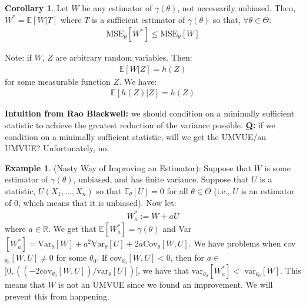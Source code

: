 \documentclass[11pt]{scrartcl}
\newcommand{\R}[0]{\mathbb{R}}
\theoremstyle{definition}
\newtheorem{corollary}{Corollary}
\newtheorem{ex}{Example}
\theoremstyle{remark}
\newcommand{\EX}[1]{\mathbb{E}\left[#1 \right]}
\newcommand{\EXth}[1]{\mathbb{E}_\theta \left[ #1 \right]}
\begin{document}
{\begin{corollary}
	Let $W$ be any estimator of $\gamma ( \theta)$, not necessarily unbiased. Then, $W^* = \EX{W|T}$ where $T$ is a sufficient estimator of $\gamma (\theta)$ so that, $\forall \theta \in \Theta$: 
	\begin{align*}
		\text{MSE}_\theta [W^*] \leq \text{MSE}_\theta [W]
	\end{align*}
\end{corollary}

Note: if $W$, $Z$ are arbitrary random variables. Then: 
\begin{align*}
	\EX{W|Z} = h(Z)
\end{align*}
for some measurable function $Z$. We have: 
\begin{align*}
	\EX{ h(Z) | Z} = h(Z) 
\end{align*}

\textbf{Intuition from Rao Blackwell:} we should condition on a minimally sufficient statistic to achieve the greatest reduction of the variance possible. \textbf{\underline{Q}:} if we condition on a minimally sufficient statistic, will we get the UMVUE/an UMVUE? Unfortunately, no. 

\begin{ex}(Nasty Way of Improving an Estimator): 
	Suppose that $W$ is some estimator of $\gamma (\theta)$, unbiased, and has finite variance. Suppose that $U$ is a statistic, $U(X_1, ..., X_n)$ so that $\EXth{U} = 0$ for all $\theta \in \Theta$ (i.e., $U$ is an estimator of $0$, which means that it is unbiased). Now let: 
	\begin{align*}
		W_a^* := W + aU
	\end{align*}
	where $a \in \R$. We get that $\EX{W_a^*} = \gamma (\theta)$ and Var$[W_a^*] = \text{Var}_\theta [W] + a^2 \text{Var}_\theta [U] + 2 a \text{Cov}_\theta [W, U] $. We have problems when cov$_{\theta_0}[W, U] \neq 0$ for some $\theta_0$. If cov$_{\theta_0}[W, U] < 0$, then for $ a \in$ \newline $ ]0, ( (-2 \text{cov}_{\theta_0} [W,U]) / \text{var}_\theta [U] ) [ $, we have that var$_{\theta_0} [W_a^*] < $ var$_{\theta_0} [W]$. This means that $W$ is not an UMVUE since we found an improvement. We will prevent this from happening. 
\end{ex}

}
\end{document}
